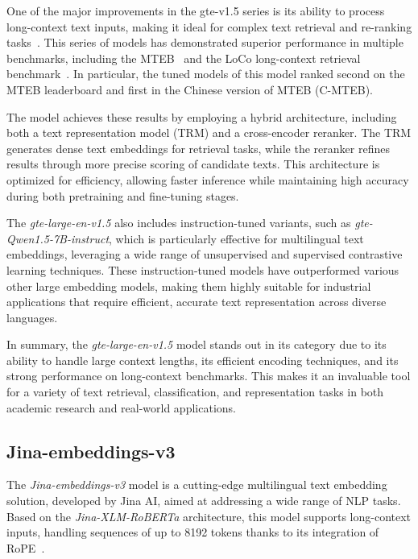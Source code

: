 One of the major improvements in the gte-v1.5 series is its ability to process long-context text inputs, making it ideal for complex text retrieval and re-ranking tasks~\cite{li2023generaltextembeddingsmultistage}.
This series of models has demonstrated superior performance in multiple benchmarks, including the \ac{MTEB}~\cite{muennighoff-etal-2023-mteb} and the LoCo long-context retrieval benchmark~\cite{saadfalcon2024benchmarkingbuildinglongcontextretrieval}.
In particular, the tuned models of this model ranked second on the MTEB leaderboard and first in the Chinese version of MTEB (C-MTEB).

The model achieves these results by employing a hybrid architecture, including both a text representation model (TRM) and a cross-encoder reranker.
The TRM generates dense text embeddings for retrieval tasks, while the reranker refines results through more precise scoring of candidate texts.
This architecture is optimized for efficiency, allowing faster inference while maintaining high accuracy during both pretraining and fine-tuning stages.

The \textit{gte-large-en-v1.5} also includes instruction-tuned variants, such as \textit{gte-Qwen1.5-7B-instruct}, which is particularly effective for multilingual text embeddings, leveraging a wide range of unsupervised and supervised contrastive learning techniques.
These instruction-tuned models have outperformed various other large embedding models, making them highly suitable for industrial applications that require efficient, accurate text representation across diverse languages.

In summary, the \textit{gte-large-en-v1.5} model stands out in its category due to its ability to handle large context lengths, its efficient encoding techniques, and its strong performance on long-context benchmarks.
This makes it an invaluable tool for a variety of text retrieval, classification, and representation tasks in both academic research and real-world applications.

\subsection{Jina-embeddings-v3}\label{subsec:jinaai}
The \textit{Jina-embeddings-v3} model is a cutting-edge multilingual text embedding solution, developed by Jina AI, aimed at addressing a wide range of \ac{NLP} tasks.
Based on the \textit{Jina-XLM-RoBERTa} architecture, this model supports long-context inputs, handling sequences of up to 8192 tokens thanks to its integration of \ac{RoPE}~\cite{su2023roformerenhancedtransformerrotary,sturua2024jinaembeddingsv3multilingualembeddingstask}.

